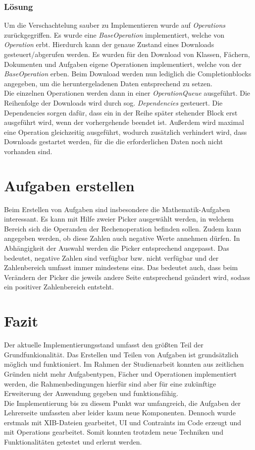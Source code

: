 \subsubsection{Lösung}
Um die Verschachtelung sauber zu Implementieren wurde auf \textit{Operations} zurückgegriffen. Es wurde eine \textit{BaseOperation} implementiert, welche von \textit{Operation} erbt. Hierdurch kann der genaue Zustand eines Downloads gesteuert/abgerufen werden.
Es wurden für den Download von Klassen, Fächern, Dokumenten und Aufgaben eigene Operationen implementiert, welche von der \textit{BaseOperation} erben.
Beim Download werden nun lediglich die Completionblocks angegeben, um die heruntergeladenen Daten entsprechend zu setzen. 
\\Die einzelnen Operationen werden dann in einer \textit{OperationQueue} ausgeführt. Die Reihenfolge der Downloads wird durch sog. \textit{Dependencies} gesteuert. Die Dependencies sorgen dafür, dass ein in der Reihe später stehender Block erst ausgeführt wird, wenn der vorhergehende beendet ist. Außerdem wird maximal eine Operation gleichzeitig ausgeführt, wodurch zusätzlich verhindert wird, dass Downloads gestartet werden, für die die erforderlichen Daten noch nicht vorhanden sind.

\section{Aufgaben erstellen}
Beim Erstellen von Aufgaben sind insbesondere die Mathematik-Aufgaben interessant. Es kann mit Hilfe zweier Picker ausgewählt werden, in welchem Bereich sich die Operanden der Rechenoperation befinden sollen. Zudem kann angegeben werden, ob diese Zahlen auch negative Werte annehmen dürfen. In Abhängigkeit der Auswahl werden die Picker entsprechend angepasst. Das bedeutet, negative Zahlen sind verfügbar bzw. nicht verfügbar und der Zahlenbereich umfasst immer mindestens eins. Das bedeutet auch, dass beim Verändern der Picker die jeweils andere Seite entsprechend geändert wird, sodass ein positiver Zahlenbereich entsteht.

\section{Fazit}
Der aktuelle Implementierungsstand umfasst den größten Teil der Grundfunkionalität. Das Erstellen und Teilen von Aufgaben ist grundsätzlich möglich und funktioniert. Im Rahmen der Studienarbeit konnten aus zeitlichen Gründen nicht mehr Aufgabentypen, Fächer und Operationen implementiert werden, die Rahmenbedingungen hierfür sind aber für eine zukünftige Erweiterung der Anwendung gegeben und funktionsfähig.
\\Die Implementierung bis zu diesem Punkt war umfangreich, die Aufgaben der Lehrerseite umfassten aber leider kaum neue Komponenten. Dennoch wurde erstmals mit XIB-Dateien gearbeitet, UI und Contraints im Code erzeugt und mit Operations gearbeitet. Somit konnten trotzdem neue Techniken und Funktionalitäten getestet und erlernt werden.